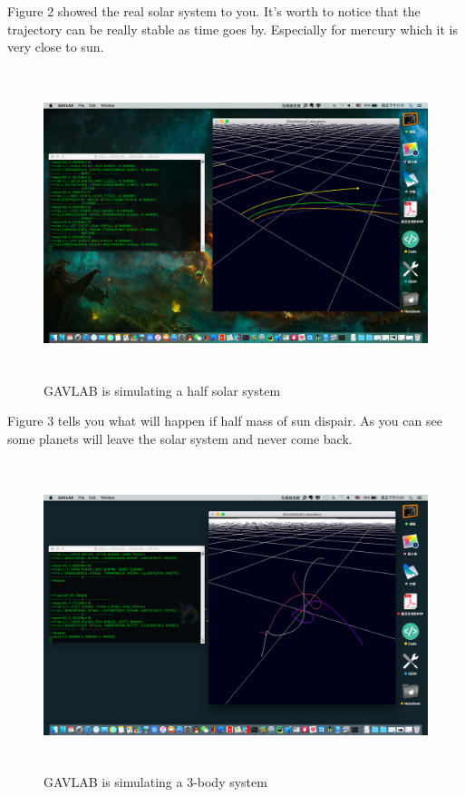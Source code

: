 \documentclass[12pt]{article}
\begin{document}
Figure 2 showed the real solar system to you.
It's worth to notice that the trajectory can be really stable as time goes by.
Especially for mercury which it is very close to sun.

\begin{figure}[H]
\centering
\includegraphics[width=14.4cm,height=9cm]{HalfSolar.png}
\caption{GAVLAB is simulating a half solar system}
\end{figure}

Figure 3 tells you what will happen if half mass of sun dispair.
As you can see some planets will leave the solar system and never come back.
 
\begin{figure}[H]
\centering
\includegraphics[width=14.4cm,height=9cm]{3Body.png}
\caption{GAVLAB is simulating a 3-body system}
\end{figure}
\end{document}
